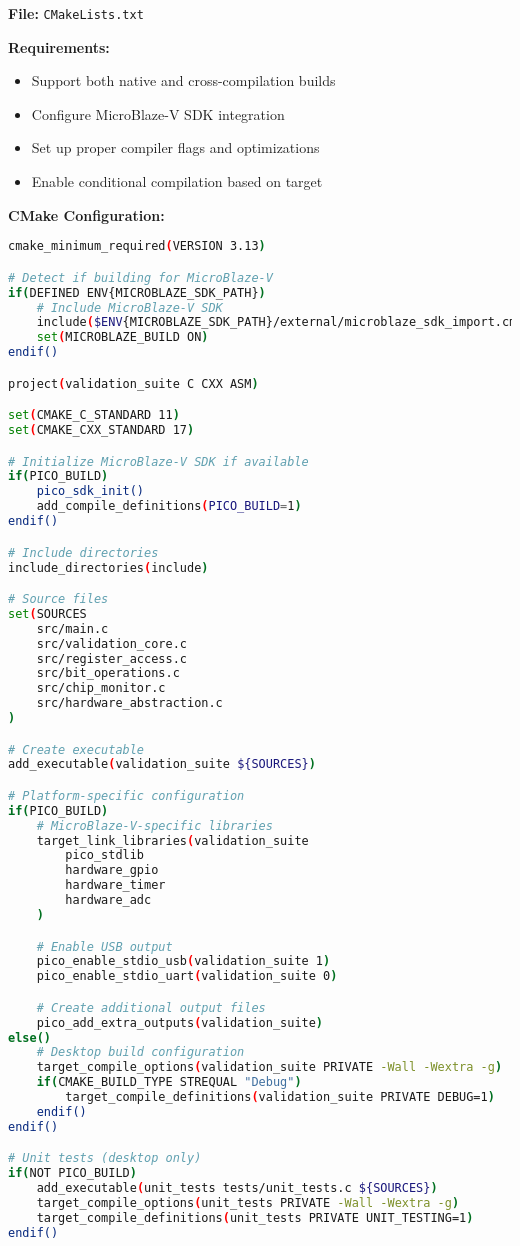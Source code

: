 \documentclass[11pt,a4paper]{article}
\begin{document}
\textbf{File:} \texttt{CMakeLists.txt}

\textbf{Requirements:}
\begin{itemize}
    \item Support both native and cross-compilation builds
    \item Configure MicroBlaze-V SDK integration
    \item Set up proper compiler flags and optimizations
    \item Enable conditional compilation based on target
\end{itemize}

\textbf{CMake Configuration:}
\begin{lstlisting}[language=bash]
cmake_minimum_required(VERSION 3.13)

# Detect if building for MicroBlaze-V
if(DEFINED ENV{MICROBLAZE_SDK_PATH})
    # Include MicroBlaze-V SDK
    include($ENV{MICROBLAZE_SDK_PATH}/external/microblaze_sdk_import.cmake)
    set(MICROBLAZE_BUILD ON)
endif()

project(validation_suite C CXX ASM)

set(CMAKE_C_STANDARD 11)
set(CMAKE_CXX_STANDARD 17)

# Initialize MicroBlaze-V SDK if available
if(PICO_BUILD)
    pico_sdk_init()
    add_compile_definitions(PICO_BUILD=1)
endif()

# Include directories
include_directories(include)

# Source files
set(SOURCES
    src/main.c
    src/validation_core.c
    src/register_access.c
    src/bit_operations.c
    src/chip_monitor.c
    src/hardware_abstraction.c
)

# Create executable
add_executable(validation_suite ${SOURCES})

# Platform-specific configuration
if(PICO_BUILD)
    # MicroBlaze-V-specific libraries
    target_link_libraries(validation_suite
        pico_stdlib
        hardware_gpio
        hardware_timer
        hardware_adc
    )

    # Enable USB output
    pico_enable_stdio_usb(validation_suite 1)
    pico_enable_stdio_uart(validation_suite 0)

    # Create additional output files
    pico_add_extra_outputs(validation_suite)
else()
    # Desktop build configuration
    target_compile_options(validation_suite PRIVATE -Wall -Wextra -g)
    if(CMAKE_BUILD_TYPE STREQUAL "Debug")
        target_compile_definitions(validation_suite PRIVATE DEBUG=1)
    endif()
endif()

# Unit tests (desktop only)
if(NOT PICO_BUILD)
    add_executable(unit_tests tests/unit_tests.c ${SOURCES})
    target_compile_options(unit_tests PRIVATE -Wall -Wextra -g)
    target_compile_definitions(unit_tests PRIVATE UNIT_TESTING=1)
endif()
\end{lstlisting}
\end{document}
